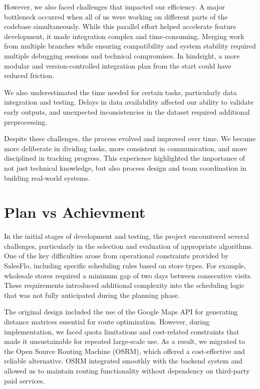 However, we also faced challenges that impacted our efficiency. A major bottleneck occurred when all of us were working on different parts of the codebase simultaneously. While this parallel effort helped accelerate feature development, it made integration complex and time-consuming. Merging work from multiple branches while ensuring compatibility and system stability required multiple debugging sessions and technical compromises. In hindsight, a more modular and version-controlled integration plan from the start could have reduced friction.

We also underestimated the time needed for certain tasks, particularly data integration and testing. Delays in data availability affected our ability to validate early outputs, and unexpected inconsistencies in the dataset required additional preprocessing.

Despite these challenges, the process evolved and improved over time. We became more deliberate in dividing tasks, more consistent in communication, and more disciplined in tracking progress. This experience highlighted the importance of not just technical knowledge, but also process design and team coordination in building real-world systems.

\section{Plan vs Achievment}
In the initial stages of development and testing, the project encountered several challenges, particularly in the selection and evaluation of appropriate algorithms. One of the key difficulties arose from operational constraints provided by SalesFlo, including specific scheduling rules based on store types. For example, wholesale stores required a minimum gap of two days between consecutive visits. These requirements introduced additional complexity into the scheduling logic that was not fully anticipated during the planning phase.

The original design included the use of the Google Maps API for generating distance matrices essential for route optimization. However, during implementation, we faced quota limitations and cost-related constraints that made it unsustainable for repeated large-scale use. As a result, we migrated to the Open Source Routing Machine (OSRM), which offered a cost-effective and reliable alternative. OSRM integrated smoothly with the backend system and allowed us to maintain routing functionality without dependency on third-party paid services.

